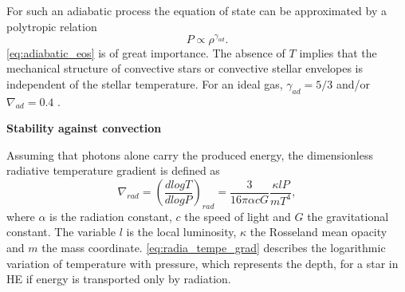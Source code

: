 For such an adiabatic process the equation of state can be approximated by a polytropic relation
\begin{equation}\label{eq:adiabatic_eos}
    P \propto \rho^{\gamma_{ad}}.
\end{equation}
\cref{eq:adiabatic_eos} is of great importance. The absence of $T$ implies that the mechanical structure of convective stars or convective stellar envelopes is independent of the stellar temperature. For an ideal gas, ${\gamma_{ad}} = 5/3$ and/or $\nabla_{ad} = 0.4$ \citep{pols2011stellar}.

{\bf Stability against convection}


Assuming that photons alone carry the produced energy, the dimensionless radiative temperature gradient is defined as
\begin{equation}\label{eq:radia_tempe_grad}
    \nabla_{rad} = \left ( \frac{d logT}{d logP} \right)_{rad} = \frac{3}{16 \pi \alpha c G} \frac{\kappa l P}{m T^4},
\end{equation}
where $\alpha$ is the radiation constant, $c$ the speed of light and $G$ the gravitational constant. The variable $l$ is the local luminosity, $\kappa$ the Rosseland mean opacity and $m$ the mass coordinate.  \cref{eq:radia_tempe_grad} describes the logarithmic variation of temperature with pressure, which represents the depth, for a star in HE if energy is transported only by radiation.

